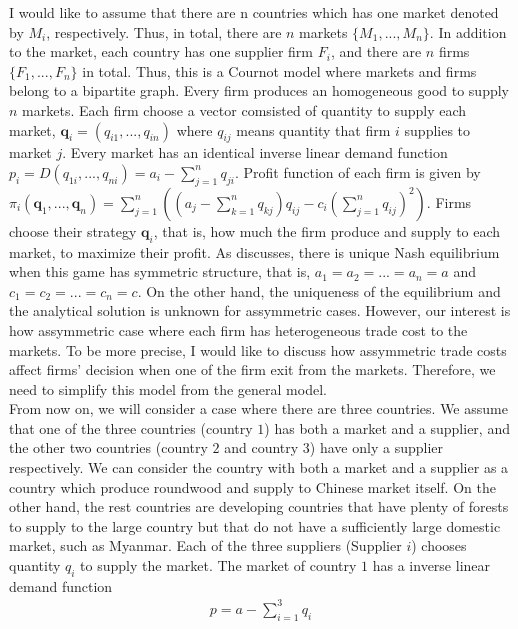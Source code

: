 \documentclass[a4paper,12pt]{article}
\begin{document}
I would like to assume that there are n countries which has one market denoted by $M_i$, respectively. Thus, in total, there are $n$ markets $\{ M_1, ..., M_n \}$. In addition to the market, each country has one supplier firm $F_i$, and there are $n$ firms $\{ F_1, ..., F_n \}$ in total. Thus, this is a Cournot model where markets and firms belong to a bipartite graph. Every firm produces an homogeneous good to supply $n$ markets. Each firm choose a vector comsisted of quantity to supply each market, $\mathbf{q}_i = (q_{i1}, ..., q_{in})$ where $q_{ij}$ means quantity that firm $i$ supplies to market $j$. Every market has an identical inverse linear demand function $p_i = D(q_{1i}, ..., q_{ni}) = a_i - \sum_{j=1}^n q_{ji}$. Profit function of each firm is given by $\pi_i (\mathbf{q}_1, ..., \mathbf{q}_n) = \sum_{j = 1}^{n} ((a_j - \sum_{k=1}^n q_{kj}) q_{ij} - c_{i} (\sum_{j = 1}^{n} q_{ij} ) ^ 2 )$. Firms choose their strategy $\mathbf{q}_i$, that is, how much the firm produce and supply to each market, to maximize their profit. As \cite{bimpikis2019cournot} discusses, there is unique Nash equilibrium when this game has symmetric structure, that is, $a_1 = a_2 = ... = a_n = a$ and $c_1 = c_2 = ... = c_n = c$. On the other hand, the uniqueness of the equilibrium and the analytical solution is unknown for assymmetric cases. However, our interest is how assymmetric case where each firm has heterogeneous trade cost to the markets. To be more precise, I would like to discuss how assymmetric trade costs affect firms' decision when one of the firm exit from the markets. Therefore, we need to simplify this model from the general model. \\

From now on, we will consider a case where there are three countries. We assume that one of the three countries (country $1$) has both a market and a supplier, and the other two countries (country $2$ and country $3$) have only a supplier respectively. We can consider the country with both a market and a supplier as a country which produce roundwood and supply to Chinese market itself. On the other hand, the rest countries are developing countries that have plenty of forests to supply to the large country but that do not have a sufficiently large domestic market, such as Myanmar. Each of the three suppliers (Supplier $i$) chooses quantity $q_i$ to supply the market. The market of country $1$ has a inverse linear demand function
\begin{align}
    p = a - \sum_{i=1}^3 q_i
\end{align}
\end{document}
